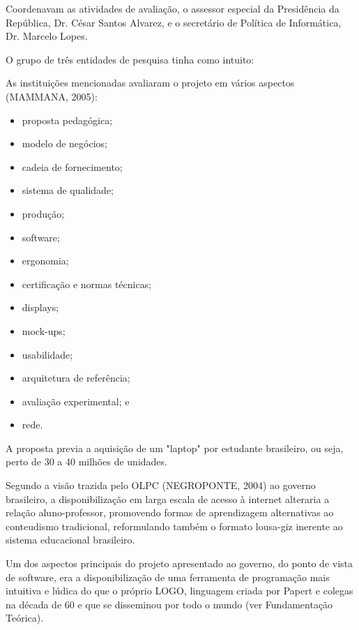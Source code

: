 Coordenavam as atividades de avaliação, o assessor especial da Presidência da República, Dr. César Santos Alvarez, e o secretário de Política de Informática, Dr. Marcelo Lopes.

O grupo de três entidades de pesquisa tinha como intuito:


\noindent\begin{flushright}\mbox{\linespread{1}\selectfont\centering{}}\end{flushright}


As instituições mencionadas avaliaram o projeto em vários aspectos  (MAMMANA, 2005):


\begin{itemize}
\item proposta pedagógica;
\item modelo de negócios;
\item cadeia de fornecimento;
\item sistema de qualidade;
\item produção;
\item software;
\item ergonomia;
\item certificação e normas técnicas;
\item displays;
\item mock-ups;
\item usabilidade;
\item arquitetura de referência;
\item avaliação experimental; e
\item rede.
\end{itemize}

A proposta previa a aquisição de um "laptop" por estudante brasileiro, ou seja, perto de 30 a 40 milhões de unidades.

Segundo a visão trazida pelo OLPC  (NEGROPONTE, 2004) ao governo brasileiro, a disponibilização em larga escala de acesso à internet alteraria a relação aluno-professor, promovendo formas de aprendizagem alternativas ao conteudismo tradicional, reformulando também o formato lousa-giz inerente ao sistema educacional brasileiro.

Um dos aspectos principais do projeto apresentado ao governo, do ponto de vista de software, era a disponibilização de uma ferramenta de programação mais intuitiva e lúdica do que o próprio LOGO, linguagem criada por Papert e colegas na década de 60 e que se disseminou por todo o mundo (ver Fundamentação Teórica).

